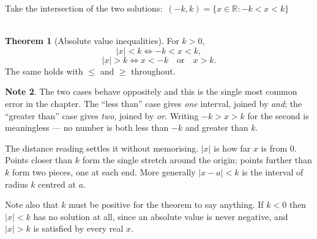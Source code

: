 \documentclass[11pt,a4paper]{article}
\theoremstyle{definition}
\newtheorem{thm}{Theorem}[section]
\newtheorem{note}[thm]{Note}
\begin{document}
Take the intersection of the two solutions: \,$(-k,k)=\{x\in \mathbb{R}:-k<x<k\}$\\\\

\begin{thm}[Absolute value inequalities]
For $k>0$,
$$\left|x\right|<k \iff -k<x<k,$$
$$\left|x\right|>k \iff x<-k \quad \text{or}\quad  x>k .$$
The same holds with $\leq$ and $\geq$ throughout.
\end{thm}

\begin{note}
The two cases behave oppositely and this is the single most common error in the
chapter. The ``less than'' case gives \emph{one} interval, joined by \emph{and};
the ``greater than'' case gives \emph{two}, joined by \emph{or}. Writing
$-k>x>k$ for the second is meaningless --- no number is both less than $-k$ and
greater than $k$.

The distance reading settles it without memorising. $\left|x\right|$ is how far $x$
is from $0$. Points closer than $k$ form the single stretch around the origin;
points further than $k$ form two pieces, one at each end. More generally
$\left|x-a\right|<k$ is the interval of radius $k$ centred at $a$.

Note also that $k$ must be positive for the theorem to say anything. If $k<0$ then
$\left|x\right|<k$ has no solution at all, since an absolute value is never
negative, and $\left|x\right|>k$ is satisfied by every real $x$.
\end{note}
\end{document}
